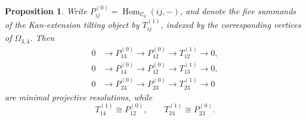 \documentclass[12pt,a4paper,english,reqno]{amsart}
\theoremstyle{plain}
\newtheorem{proposition}[theorem]{Proposition}
\theoremstyle{definition}
\newcommand{\Hom}{\operatorname{Hom}}
\newcommand{\C}{\mathcal C}
\begin{document}
\begin{proposition}
\label{prop:34-Kan-resolutions}
Write $P_{ij}^{(0)}=\Hom_{\C_0}(ij,-)$, and denote the five summands of
the Kan-extension tilting object by $T_{ij}^{(1)}$, indexed by the
corresponding vertices of $\Omega_{3,4}$.  Then
\[
\begin{aligned}
 0&\longrightarrow P_{13}^{(0)}
   \longrightarrow P_{12}^{(0)}
   \longrightarrow T_{12}^{(1)}
   \longrightarrow0,\\
 0&\longrightarrow P_{14}^{(0)}
   \longrightarrow P_{12}^{(0)}
   \longrightarrow T_{13}^{(1)}
   \longrightarrow0,\\
 0&\longrightarrow P_{24}^{(0)}
   \longrightarrow P_{23}^{(0)}
   \longrightarrow T_{23}^{(1)}
   \longrightarrow0
\end{aligned}
\]
are minimal projective resolutions, while
\[
 T_{14}^{(1)}\cong P_{12}^{(0)},
 \qquad
 T_{24}^{(1)}\cong P_{23}^{(0)}.
\]
\end{proposition}
\end{document}
